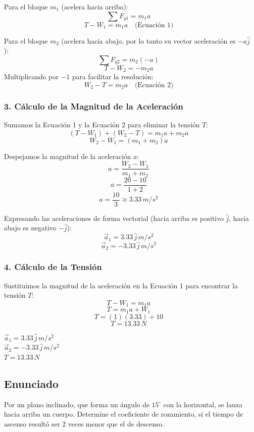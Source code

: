 \documentclass[12pt, a4paper]{article}
\begin{document}
Para el bloque $m_1$ (acelera hacia arriba):
$$ \sum F_{y1} = m_1 a $$
$$ T - W_1 = m_1 a \quad \text{(Ecuación 1)} $$

Para el bloque $m_2$ (acelera hacia abajo, por lo tanto su vector aceleración es $-a\hat{j}$):
$$ \sum F_{y2} = m_2 (-a) $$
$$ T - W_2 = -m_2 a $$
Multiplicando por $-1$ para facilitar la resolución:
$$ W_2 - T = m_2 a \quad \text{(Ecuación 2)} $$

\subsubsection*{3. Cálculo de la Magnitud de la Aceleración}
Sumamos la Ecuación 1 y la Ecuación 2 para eliminar la tensión $T$:
$$ (T - W_1) + (W_2 - T) = m_1 a + m_2 a $$
$$ W_2 - W_1 = (m_1 + m_2) a $$

Despejamos la magnitud de la aceleración $a$:
$$ a = \frac{W_2 - W_1}{m_1 + m_2} $$
$$ a = \frac{20 - 10}{1 + 2} $$
$$ a = \frac{10}{3} \approx 3.33 \, \si{m/s^2} $$

Expresando las aceleraciones de forma vectorial (hacia arriba es positivo $\hat{j}$, hacia abajo es negativo $-\hat{j}$):
$$ \vec{a}_1 = 3.33 \, \hat{j} \, \si{m/s^2} $$
$$ \vec{a}_2 = -3.33 \, \hat{j} \, \si{m/s^2} $$

\subsubsection*{4. Cálculo de la Tensión}
Sustituimos la magnitud de la aceleración en la Ecuación 1 para encontrar la tensión $T$:
$$ T - W_1 = m_1 a $$
$$ T = m_1 a + W_1 $$
$$ T = (1)(3.33) + 10 $$
$$ T = 13.33 \, \si{N} $$

\begin{tcolorbox}[colback=green!5!white, colframe=green!50!black, title=Respuesta Final]
\centering
$\vec{a}_1 = 3.33 \, \hat{j} \, \si{m/s^2}$ \\
$\vec{a}_2 = -3.33 \, \hat{j} \, \si{m/s^2}$ \\
$T = 13.33 \, \si{N}$
\end{tcolorbox}

\newpage

\subsection*{Enunciado}
Por un plano inclinado, que forma un ángulo de $15^\circ$ con la horizontal, se lanza hacia arriba un cuerpo. Determine el coeficiente de rozamiento, si el tiempo de ascenso resultó ser 2 veces menor que el de descenso.
\end{document}

